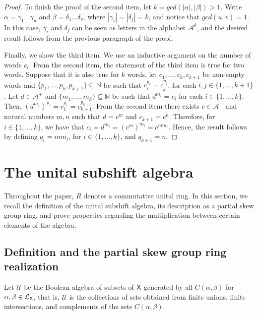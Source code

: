 \documentclass[a4paper,12pt]{amsart}
\theoremstyle{definition}
\theoremstyle{remark}
\numberwithin{equation}{section}
\newcommand{\osf}{{\normalfont \textsf{X}}}
\newcommand{\lang}{\CL_{\osf}}
\newcommand{\alf}{\mathscr{A}}
\newcommand{\N}{\mathbb{N}}
\newcommand{\CL}{\mathcal{L}}
\newcommand{\TCB}{\mathcal{U}}
\begin{document}
\begin{proof}
To finish the proof of the second item, let $k=gcd(|\alpha|, |\beta|)>1$. Write $\alpha=\gamma_1...\gamma_u$ and $\beta=\delta_1...\delta_v$, where $|\gamma_i|=|\delta_j|=k$, and notice that $gcd(u,v)=1$. In this case, $\gamma_i$ and $\delta_j$ can be seen as letters in the alphabet $\alf^k$, and the desired result follows from the previous paragraph of the proof.

Finally, we show the third item. We use an inductive argument on the number of words $c_i$. From the second item, the statement of the third item is true for two words. Suppose that it is also true for $k$ words, let $c_1,...,c_k,{c}_{k+1}$ be non-empty words and $\{p_1,...,p_k, p_{k+1}\}\subseteq \N$ be such that $c_i^{p_i}=c_j^{p_j}$, for each $i,j\in \{1,...,k+1\}$. Let $d\in \alf^+$ and $\{m_1,...,m_k\}\subseteq \N$ be such that $d^{m_i}=c_i$ for each $i\in \{1,...,k\}$. 
Then, $(d^{m_1})^{p_1}=c_1^{p_1}= c_{k+1}^{p_{k+1}}$. %
 From the second item there exists $c\in \alf^+$ and natural numbers $m,n$ such that $d=c^m$ and $c_{k+1}=c^n$. Therefore, for $i\in \{1,...,k\}$, we have that $c_i=d^{m_i}=(c^m)^{m_i}=c^{mm_i}$. Hence, the result follows by defining $q_i=mm_i$, for $i\in\{1,...,k\}$, and $q_{k+1}=n$. 
\end{proof}

\section{The unital subshift algebra}\label{unital}

Throughout the paper, $R$ denotes a commutative unital ring. In this section, we recall the definition of the unital subshift algebra, its description as a partial skew group ring, and prove properties regarding the multiplication between certain elements of the algebra.

\subsection{Definition and the partial skew group ring realization}\label{theoretic.pa}
Let $\TCB$ be the Boolean algebra of subsets of $\osf$ generated by all $C(\alpha,\beta)$ for $\alpha,\beta\in\lang$, that is, $\TCB$ is the collections of sets obtained from finite unions, finite intersections, and complements of the sets $C(\alpha,\beta)$. %
\end{document}
